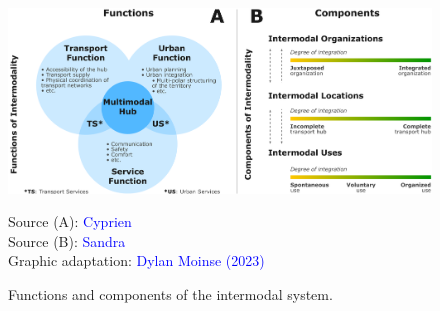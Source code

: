 \begin{refsegment}
\begin{figure}[h!]\vspace*{4pt}
    \caption{Functions and components of the intermodal system.}
    \label{fig-chap1:composantes-fonctions-intermodalite}
    \centerline{\includegraphics[width=1\columnwidth]{src/Figures/Chap-1/EN_Fonctions_Composants_Intermodalite.pdf}}
    \vspace{5pt}
    \begin{flushright}\scriptsize{
    Source (A): \textcolor{blue}{Cyprien} \textcolor{blue}{\textcite[14]{richer_lemergence_2008}}
    \\
    Source (B): \textcolor{blue}{Sandra} \textcolor{blue}{\textcite[167]{bozzani_grandes_2006}}
    \\
    Graphic adaptation: \textcolor{blue}{Dylan Moinse (2023)}
    }\end{flushright}
\end{figure}


\end{refsegment}
